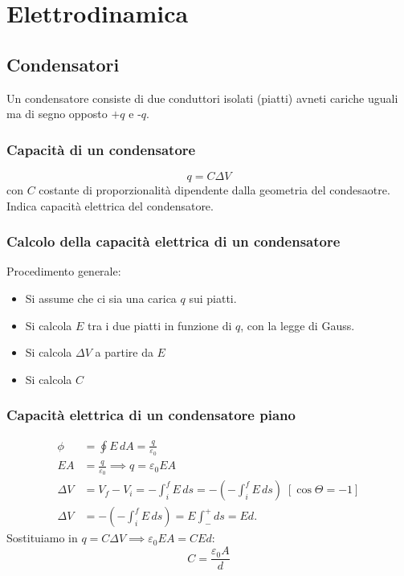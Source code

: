 \chapter{Elettrodinamica}

    \section{Condensatori} Un condensatore consiste di due conduttori isolati
    (piatti) avneti cariche uguali ma di segno opposto $+q$ e -$q$.

        \subsection{Capacità di un condensatore}
            \begin{equation}
                q = C\Delta V
            \end{equation}
        con $C$ costante di proporzionalità dipendente dalla geometria del 
        condesaotre. Indica capacità elettrica del condensatore.
        
        \subsection{Calcolo della capacità elettrica di un condensatore} 
        Procedimento generale:
            \begin{itemize}
                \item Si assume che ci sia una carica $q$ sui piatti.
                \item Si calcola $E$ tra i due piatti in funzione di $q$, con 
                la legge di Gauss.
                \item Si calcola $\Delta V$ a partire da $E$
                \item Si calcola $C$
            \end{itemize}
        
        \subsection{Capacità elettrica di un condensatore piano}
            \begin{align*}
                \phi &= \oint E \, dA = \frac{q}{\varepsilon_0} \\
                EA &= \frac{q}{\varepsilon_0} \implies q = \varepsilon_0 E A \\
                \Delta V &= V_f - V_i = -\int_{i}^{f} E \, ds 
                        = -(-\int_{i}^{f} E \, ds) \; [\cos\Theta = -1]\\
                \Delta V &= -(-\int_{i}^{f} E \, ds) = E \int_{-}^{+} ds = Ed.
            \end{align*}
        Sostituiamo in $q = C\Delta V \implies \varepsilon_0EA = CEd$:
            \begin{equation}
                C = \frac{\varepsilon_0A}{d}
            \end{equation}

